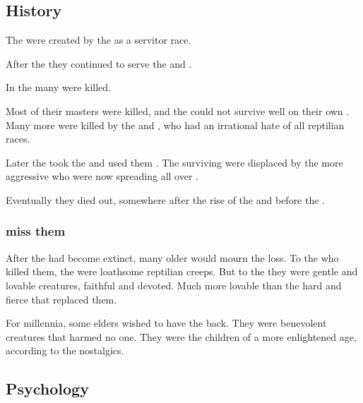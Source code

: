 \subsection{History}
The \loculs{} were created by the \ophidians{} as a servitor race.

After the \firstbanewar{} they continued to serve the \dragons{} and \quiljaaran. 

In the  many \loculs{} were killed. 

Most of their \quiljaaran{} masters were killed, and the \loculs{} could not survive well on their own . 
Many more were killed by the \aryothim{} and \nephilim, who had an irrational hate of all reptilian races. 

Later the \dzraicchenosses{} took the \loculs{} and used them . 
The surviving \loculs{} were displaced by the more aggressive \scathae{} who were now spreading all over \Miith. 

Eventually they died out, somewhere after the rise of the \dzraicchenosses{} and before the \secondbanewar. 





\subsubsection{\QuilJaaran{} miss them}
After the \loculs{} had become extinct, many older \quiljaaran{} would mourn the loss. 
To the \nephilim{} who killed them, the \loculs{} were loathsome reptilian creeps.
But to the \quiljaaran{} they were gentle and lovable creatures, faithful and devoted. 
Much more lovable than the hard and fierce \scathae{} that replaced them. 

For millennia, some \quiljaaran{} elders wished to have the \loculs{} back. 
They were benevolent creatures that harmed no one. 
They were the children of a more enlightened age, according to the nostalgics. 









\subsection{Psychology}






